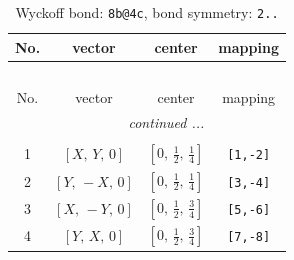 \documentclass[fleqn,8pt]{jsarticle}
\begin{document}
\renewcommand{\arraystretch}{1.2}
\begin{longtable}{cccc}
\caption{Wyckoff bond: {\tt 8b@4c}, bond symmetry: {\tt 2..}}
 \\
 \hline \hline
No. & vector & center & mapping \\ \hline \endfirsthead

\multicolumn{3}{l}{\tablename\ \thetable{}} \\
 \hline \hline
No. & vector & center & mapping \\ \hline \endhead

 \hline \hline
\multicolumn{3}{r}{\footnotesize\it continued ...} \\ \endfoot

 \hline \hline
\multicolumn{3}{r}{} \\ \endlastfoot

1 & $\left[ X,\, Y,\, 0 \right]$ & $\left[ 0,\, \frac{1}{2},\, \frac{1}{4} \right]$ & {\tt [1,-2]} \\ \hline
2 & $\left[ Y,\, - X,\, 0 \right]$ & $\left[ 0,\, \frac{1}{2},\, \frac{1}{4} \right]$ & {\tt [3,-4]} \\ \hline
3 & $\left[ X,\, - Y,\, 0 \right]$ & $\left[ 0,\, \frac{1}{2},\, \frac{3}{4} \right]$ & {\tt [5,-6]} \\ \hline
4 & $\left[ Y,\, X,\, 0 \right]$ & $\left[ 0,\, \frac{1}{2},\, \frac{3}{4} \right]$ & {\tt [7,-8]} \\
\end{longtable}
\renewcommand{\arraystretch}{1.2}
\end{document}
